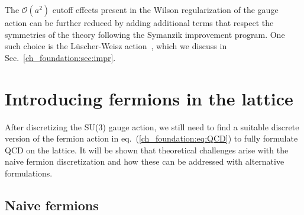 The $\mathcal{O}(a^2)$ cutoff effects present in the Wilson regularization of the gauge action can be further reduced by adding additional terms that respect the symmetries of the theory following the Symanzik improvement program. One such choice is the Lüscher-Weisz action~\citep{Luscher:1984xn}, which we discuss in Sec.~\ref{ch_foundation:sec:impr}.



\section{Introducing fermions in the lattice}
\label{ch_foundation:sec:Fermions}


After discretizing the SU(3) gauge action, we still need to find a suitable discrete version of the fermion action in eq.~(\ref{ch_foundation:eq:QCD}) to fully formulate QCD on the lattice. It will be shown that theoretical challenges arise with the naive fermion discretization and how these can be addressed with alternative formulations.

\subsection{Naive fermions}
\label{ch_foundation:subsec:Naive}

